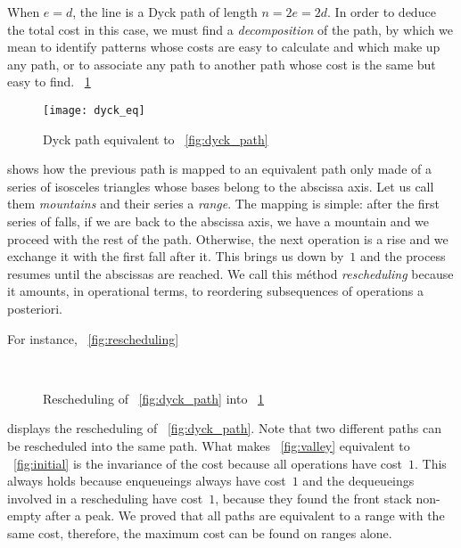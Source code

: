 When \(e=d\), the line is a Dyck path of length \(n=2e=2d\). In order
to deduce the total cost in this case, we must find a
\emph{decomposition} of the path, by
which we mean to identify patterns whose costs are easy to calculate
and which make up any path, or to associate any path to another path
whose cost is the same but easy to find. \Fig~\ref{fig:dyck_eq}
\begin{figure}[!b]
\centering
\texttt{[image: dyck\_eq]}
\caption{Dyck path equivalent to \fig~\ref{fig:dyck_path}}
\label{fig:dyck_eq}
\end{figure}
shows how the previous path is mapped to an equivalent path only made
of a series of isosceles triangles whose bases belong to the abscissa
axis. Let us call them \emph{mountains} and
their series a \emph{range}. The mapping is
simple: after the first series of falls, if we are back to the
abscissa axis, we have a mountain and we proceed with the rest of the
path. Otherwise, the next operation is a rise and we exchange it with
the first fall after it. This brings us down by~\(1\) and the process
resumes until the abscissas are reached. We call this méthod
\emph{rescheduling} because it amounts,
in operational terms, to reordering subsequences of operations a
posteriori.

For instance, \fig~\vref{fig:rescheduling}
\begin{figure}
\centering
{}
\qquad
{}\\
\qquad
{}
\caption{Rescheduling of \fig~\ref{fig:dyck_path} into \fig~\ref{fig:dyck_eq}}
\label{fig:rescheduling}
\end{figure}
displays the rescheduling of \fig~\vref{fig:dyck_path}. Note that two
different paths can be rescheduled into the same path. What makes
\fig~\ref{fig:valley} equivalent to \fig~\ref{fig:initial} is the
invariance of the cost because all operations have cost~\(1\). This
always holds because enqueueings always have cost~\(1\) and the
dequeueings involved in a rescheduling have cost~\(1\), because they
found the front stack non\hyp{}empty after a peak. We proved that all
paths are equivalent to a range with the same cost, therefore, the
maximum cost can be found on ranges alone.

